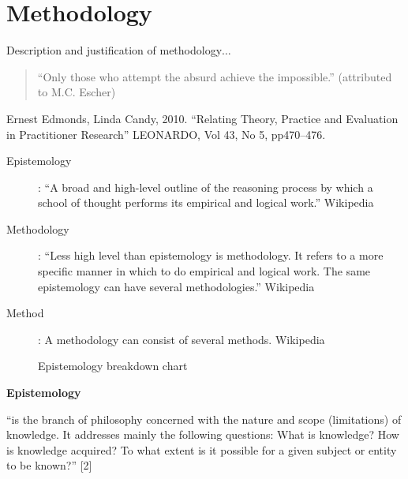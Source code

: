 
\chapter{Methodology}
\label{ch:method}

\vspace{1cm}
\startcontents[chapters]
\minicontents
\vspace{1cm}

\begin{shaded}
  Description and justification of methodology$\ldots$
\end{shaded}

\begin{quote}
  ``Only those who attempt the absurd achieve the impossible.'' (attributed to M.C. Escher)
\end{quote}

Ernest Edmonds, Linda Candy, 2010. ``Relating Theory, Practice and Evaluation in Practitioner Research'' LEONARDO, Vol 43, No 5, pp470--476.

\begin{description}
  \item [Epistemology]:	``A broad and high-level outline of the reasoning process by which a school of thought performs its empirical and logical work.'' Wikipedia
  \item [Methodology]: ``Less high level than epistemology is methodology. It refers to a more specific manner in which to do empirical and logical work. The same epistemology can have several methodologies.'' Wikipedia
  \item [Method]:	A methodology can consist of several methods. Wikipedia
\end{description}

\begin{figure}[htb]
  \centering
  \caption[Epistemology]{Epistemology breakdown chart}
\label{fig:method}
\end{figure}

\textbf{Epistemology}

``is the branch of philosophy concerned with the nature and scope (limitations) of knowledge. It addresses mainly the following questions: What is knowledge? How is knowledge acquired? To what extent is it possible for a given subject or entity to be known?'' [2]

